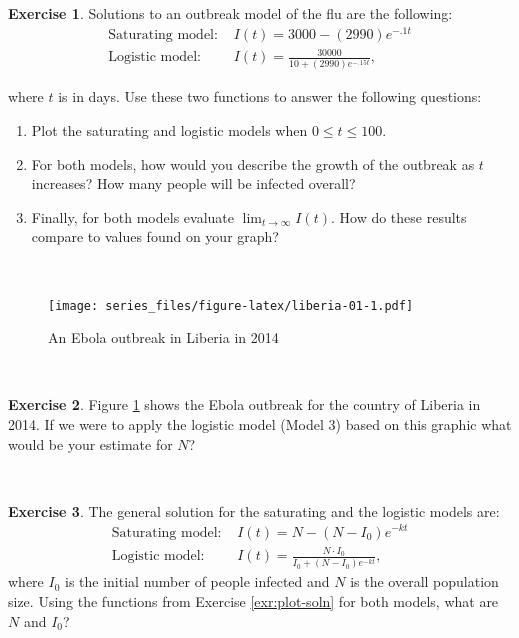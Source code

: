 \documentclass[
]{book}
\theoremstyle{definition}
\theoremstyle{definition}
\theoremstyle{definition}
\newtheorem{exercise}{Exercise}[chapter]
\theoremstyle{remark}
\begin{document}
\begin{exercise}
\protect\hypertarget{exr:plot-soln}{}{\label{exr:plot-soln} }Solutions to an outbreak model of the flu are the following:
\begin{align*}
\mbox{Saturating model: } & I(t) = 3000-(2990)e^{-.1t} \\
\mbox{Logistic model: } &  I(t) = \frac{30000 }{10+(2990)e^{-.15t}},
\end{align*}

where \(t\) is in days. Use these two functions to answer the following questions:

\begin{enumerate}[label=\alph*.]
  \item Plot the saturating and logistic models when $0 \leq t \leq 100$.  
\item For both models, how would you describe the growth of the outbreak as $t$ increases?  How many people will be infected overall?  
  \item Finally, for both models evaluate $\lim_{t \rightarrow \infty} I(t)$. How do these results compare to values found on your graph?
  \end{enumerate}
\end{exercise}

~

\begin{figure}
\centering
\texttt{[image: series\_files/figure-latex/liberia-01-1.pdf]}
\caption{\label{fig:liberia-01}An Ebola outbreak in Liberia in 2014}
\end{figure}

~
\begin{exercise}
\protect\hypertarget{exr:unnamed-chunk-3}{}{\label{exr:unnamed-chunk-3} }Figure \ref{fig:liberia-01} shows the Ebola outbreak for the country of Liberia in 2014.
If we were to apply the logistic model (Model 3) based on this graphic what would be your estimate for \(N\)?
\end{exercise}
~

\begin{exercise}
\protect\hypertarget{exr:unnamed-chunk-4}{}{\label{exr:unnamed-chunk-4} }The general solution for the saturating and the logistic models are:
\begin{align*}
\mbox{Saturating model: } & I(t) = N-(N-I_{0})e^{-kt} \\
\mbox{Logistic model: } &  I(t) = \frac{N \cdot I_{0} }{I_{0}+(N-I_{0})e^{-kt}},
\end{align*}
where \(I_{0}\) is the initial number of people infected and \(N\) is the overall population size. Using the functions from Exercise \ref{exr:plot-soln} for both models, what are \(N\) and \(I_{0}\)?
\end{exercise}
~
\end{document}
